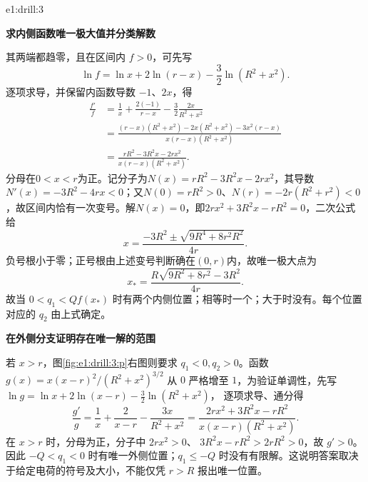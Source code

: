 \begin{drillsolution}{e1:drill:3}
\par\medskip{}\noindent\textbf{求内侧函数唯一极大值并分类解数}\par\nobreak
其两端都趋零，且在区间内 $f>0$，可先写
\[
 \ln f=\ln x+2\ln(r-x)-\frac32\ln(R^2+x^2).
\]
逐项求导，并保留内函数导数 $-1$、$2x$，得
\begin{align*}
 \frac{f'}f
 &=\frac1x+\frac{2(-1)}{r-x}-\frac32\frac{2x}{R^2+x^2}\\
 &=\frac{(r-x)(R^2+x^2)-2x(R^2+x^2)-3x^2(r-x)}
         {x(r-x)(R^2+x^2)}\\
 &=\frac{rR^2-3R^2x-2rx^2}{x(r-x)(R^2+x^2)}.
\end{align*}
分母在$0<x<r$为正。记分子为$N(x)=rR^2-3R^2x-2rx^2$，其导数$N'(x)=-3R^2-4rx<0$；又$N(0)=rR^2>0$、$N(r)=-2r(R^2+r^2)<0$，故区间内恰有一次变号。解$N(x)=0$，即$2rx^2+3R^2x-rR^2=0$，二次公式给
\[
x=\frac{-3R^2\pm\sqrt{9R^4+8r^2R^2}}{4r}.
\]
负号根小于零；正号根由上述变号判断确在$(0,r)$内，故唯一极大点为
\[
 x_*=\frac{R\sqrt{9R^2+8r^2}-3R^2}{4r}.
\]
故当 $0<q_1<Qf(x_*)$ 时有两个内侧位置；相等时一个；大于时没有。每个位置对应的 $q_2$ 由上式确定。



\par\medskip{}\noindent\textbf{在外侧分支证明存在唯一解的范围}\par\nobreak
若 $x>r$，图\ref{fig:e1:drill:3:p}右图则要求 $q_1<0,q_2>0$。函数 $g(x)=x(x-r)^2/(R^2+x^2)^{3/2}$ 从 $0$ 严格增至 $1$，为验证单调性，先写
$\ln g=\ln x+2\ln(x-r)-\tfrac32\ln(R^2+x^2)$，
逐项求导、通分得
\[
 \frac{g'}g=\frac1x+\frac2{x-r}-\frac{3x}{R^2+x^2}
 =\frac{2rx^2+3R^2x-rR^2}{x(x-r)(R^2+x^2)}.
\]
在 $x>r$ 时，分母为正，分子中 $2rx^2>0$、
$3R^2x-rR^2>2rR^2>0$，故 $g'>0$。因此 $-Q<q_1<0$ 时有唯一外侧位置；$q_1\le -Q$ 时没有有限解。这说明答案取决于给定电荷的符号及大小，不能仅凭 $r>R$ 报出唯一位置。\end{drillsolution}
